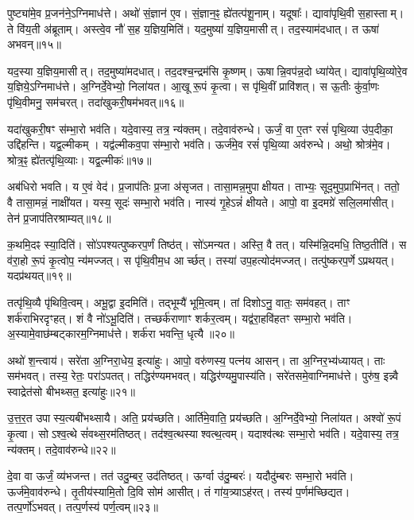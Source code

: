 पुष्ट्या॑मे॒व प्र॒जन॑ने॒\-ऽग्निमाध॑त्ते।
अथो॑ सं॒ज्ञान॑ ए॒व।
सं॒ज्ञान॒ꣴ॒ ह्ये॑तत्प॑शू॒नाम्।
यदूषाः᳚।
द्यावा॑पृथि॒वी स॒हास्ताम्।
ते वि॑य॒ती अ॑ब्रूताम्।
अस्त्वे॒व नौ॑ स॒ह य॒ज्ञिय॒मिति॑।
यद॒मुष्या॑ य॒ज्ञिय॒मासीत्।
तद॒स्याम॑दधात्।
त ऊषा॑ अभवन्॥१५॥

यद॒स्या य॒ज्ञिय॒मासीत्।
तद॒मुष्या॑मदधात्।
तद॒दश्च॒न्द्रम॑सि कृ॒ष्णम्।
ऊषान्नि॒वप॑न्न॒दो ध्या॑येत्।
द्यावा॑पृथि॒व्योरे॒व य॒ज्ञिये॒\-ऽग्निमाध॑त्ते।
अ॒ग्निर्दे॒वेभ्यो॒ निला॑यत।
आ॒खू रू॒पं कृ॒त्वा।
स पृ॑थि॒वीं प्रावि॑शत्।
स ऊ॒तीः कु॑र्वा॒णः पृ॑थि॒वीमनु॒ सम॑चरत्।
तदा॑खुकरी॒षम॑भवत्॥१६॥

यदा॑खुकरी॒षꣳ स॑म्भा॒रो भव॑ति।
यदे॒वास्य॒ तत्र॒ न्य॑क्तम्।
तदे॒वाव॑रुन्धे।
ऊर्जं॒ वा ए॒तꣳ रसं॑ पृथि॒व्या उ॑प॒दीका॒ उद्दि॑हन्ति।
यद्व॒ल्मीकम्।
यद्व॑ल्मीकव॒पा स॑म्भा॒रो भव॑ति।
ऊर्ज॑मे॒व रसं॑ पृथि॒व्या अव॑रुन्धे।
अथो॒ श्रोत्र॑मे॒व।
श्रोत्र॒ꣴ॒ ह्ये॑तत्पृ॑थि॒व्याः।
यद्व॒ल्मीकः॑॥१७॥

अब॑धिरो भवति।
य ए॒वं वेद॑।
प्र॒जाप॑तिः प्र॒जा अ॑सृजत।
तासा॒मन्न॒मुपाक्षीयत।
ताभ्यः॒ सूद॒मुप॒प्राभि॑नत्।
ततो॒ वै तासा॒मन्नं॒ नाक्षी॑यत।
यस्य॒ सूदः॑ सम्भा॒रो भव॑ति।
नास्य॑ गृ॒हेऽन्नं॑ क्षीयते।
आपो॒ वा इ॒दमग्रे॑ सलि॒लमा॑सीत्।
तेन॑ प्र॒जाप॑तिरश्राम्यत्॥१८॥

क॒थमि॒दꣴ स्या॒दिति॑।
सो॑ऽपश्यत्पुष्करप॒र्णं तिष्ठ॑त्।
सो॑ऽमन्यत।
अस्ति॒ वै तत्।
यस्मि॑न्नि॒दमधि॒ तिष्ठ॒तीति॑।
स व॑रा॒हो रू॒पं कृ॒त्वोप॒ न्य॑मज्जत्।
स पृ॑थि॒वीम॒ध आर्च्छत्।
तस्या॑ उप॒हत्योद॑मज्जत्।
तत्पु॑ष्करप॒र्णे\-ऽप्रथयत्।
यदप्र॑थयत्॥१९॥

तत्पृ॑थि॒व्यै पृ॑थिवि॒त्वम्।
अभू॒द्वा इ॒दमिति॑।
तद्भूम्यै॑ भूमि॒त्वम्।
तां दिशोऽनु॒ वातः॒ सम॑वहत्।
ताꣳ शर्क॑राभिरदृꣳहत्।
शं वै नो॑ऽभू॒दिति॑।
तच्छर्क॑राणाꣳ शर्कर॒त्वम्।
यद्व॑रा॒हवि॑हतꣳ सम्भा॒रो भव॑ति।
अ॒स्यामे॒वाछ॑म्बट्कारम॒ग्निमाध॑त्ते।
शर्क॑रा भवन्ति॒ धृत्यै॥२०॥

अथो॑ श॒न्त्वाय॑।
सरे॑ता अ॒ग्निरा॒धेय॒ इत्या॑हुः।
आपो॒ वरु॑णस्य॒ पत्न॑य आसन्।
ता अ॒ग्निर॒भ्य॑ध्यायत्।
ताः सम॑भवत्।
तस्य॒ रेतः॒ परा॑ऽपतत्।
तद्धिर॑ण्यमभवत्।
यद्धिर॑ण्यमु॒पास्य॑ति।
सरे॑तसमे॒वाग्निमाध॑त्ते।
पुरु॑ष॒ इन्न्वै स्वाद्रेत॑सो बीभथ्सत॒ इत्या॑हुः॥२१॥

उ॒त्त॒र॒त उपास्य॒त्यबी॑भथ्सायै।
अति॒ प्रय॑च्छति।
आर्ति॑मे॒वाति॒ प्रय॑च्छति।
अ॒ग्निर्दे॒वेभ्यो॒ निला॑यत।
अश्वो॑ रू॒पं कृ॒त्वा।
सोऽश्व॒त्थे सं॑वथ्स॒रम॑तिष्ठत्।
तद॑श्व॒त्थस्याश्वत्थ॒त्वम्।
यदाश्व॑त्थः सम्भा॒रो भव॑ति।
यदे॒वास्य॒ तत्र॒ न्य॑क्तम्।
तदे॒वाव॑रुन्धे॥२२॥

दे॒वा वा ऊर्जं॒ व्य॑भजन्त।
तत॑ उदु॒म्बर॒ उद॑तिष्ठत्।
ऊर्ग्वा उ॑दु॒म्बरः॑।
यदौदु॑म्बरः सम्भा॒रो भव॑ति।
ऊर्ज॑मे॒वाव॑रुन्धे।
तृ॒तीय॑स्यामि॒तो दि॒वि सोम॑ आसीत्।
तं गा॑य॒त्र्या\-ऽह॑रत्।
तस्य॑ प॒र्णम॑च्छिद्यत।
तत्प॒र्णो॑\-ऽभवत्।
तत्प॒र्णस्य॑ पर्ण॒त्वम्॥२३॥

